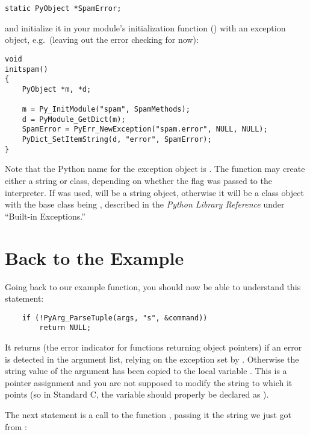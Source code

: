 \documentclass{manual}
\begin{document}
\begin{verbatim}
static PyObject *SpamError;
\end{verbatim}

and initialize it in your module's initialization function
() with an exception object, e.g.\ (leaving out
the error checking for now):

\begin{verbatim}
void
initspam()
{
    PyObject *m, *d;

    m = Py_InitModule("spam", SpamMethods);
    d = PyModule_GetDict(m);
    SpamError = PyErr_NewException("spam.error", NULL, NULL);
    PyDict_SetItemString(d, "error", SpamError);
}
\end{verbatim}

Note that the Python name for the exception object is
.  The  function
may create either a string or class, depending on whether the
 flag was passed to the interpreter.  If  was used,
 will be a string object, otherwise it will be a
class object with the base class being ,
described in the \emph{Python Library Reference} under ``Built-in
Exceptions.''


\section{Back to the Example
         \label{backToExample}}

Going back to our example function, you should now be able to
understand this statement:

\begin{verbatim}
    if (!PyArg_ParseTuple(args, "s", &command))
        return NULL;
\end{verbatim}

It returns \NULL{} (the error indicator for functions returning
object pointers) if an error is detected in the argument list, relying
on the exception set by .  Otherwise the
string value of the argument has been copied to the local variable
.  This is a pointer assignment and you are not supposed
to modify the string to which it points (so in Standard C, the variable
 should properly be declared as ).

The next statement is a call to the \UNIX{} function
, passing it the string we just got from
:
\end{document}
